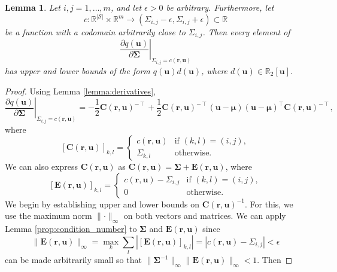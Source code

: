 \documentclass{article}
\newtheorem{lemma}[theorem]{Lemma}
\theoremstyle{definition}
\theoremstyle{remark}
\begin{document}
\begin{lemma} \label{lemma:bound3}
  Let $i, j = 1, \dots, m$, and let $\epsilon > 0$ be arbitrary. Furthermore,
  let
  \[
    c : \mathbb{R}^{|\mathcal{S}|} \times \mathbb{R}^m \to (\Sigma_{i,j} - \epsilon,
    \Sigma_{i,j} + \epsilon) \subset \mathbb{R}
  \]
  be a function with a codomain arbitrarily close to $\Sigma_{i,j}$. Then every
  element of
  \[
    \left. \frac{\partial q(\mathbf{u})}{\partial \bm\Sigma} \right|_{\Sigma_{i,j} =
    c(\mathbf{r}, \mathbf{u})}
  \]
  has upper and lower bounds of the form $q(\mathbf{u})d(\mathbf{u})$, where
  $d(\mathbf{u}) \in \mathbb{R}_2[\mathbf{u}]$.
\end{lemma}
\begin{proof}
  Using Lemma \ref{lemma:derivatives},
  \[
    \left. \frac{\partial q(\mathbf{u})}{\partial \bm\Sigma} \right|_{\Sigma_{i,j} =
    c(\mathbf{r}, \mathbf{u})} =
    -\frac{1}{2}\mathbf{C}(\mathbf{r}, \mathbf{u})^{-\intercal} +
    \frac{1}{2}\mathbf{C}(\mathbf{r}, \mathbf{u})^{-\intercal}(\mathbf{u} -
    \bm\mu)(\mathbf{u} -
    \bm\mu)^\intercal\mathbf{C}(\mathbf{r}, \mathbf{u})^{-\intercal},
  \]
  where
  \[
    [\mathbf{C}(\mathbf{r}, \mathbf{u})]_{k,l} =
    \begin{cases}
      c(\mathbf{r}, \mathbf{u}) & \text{if } (k, l) = (i, j), \\
      \Sigma_{k,l} & \text{otherwise.}
    \end{cases}
  \]
  We can also express $\mathbf{C}(\mathbf{r},\mathbf{u})$ as
  $\mathbf{C}(\mathbf{r}, \mathbf{u}) = \bm\Sigma + \mathbf{E}(\mathbf{r},
  \mathbf{u})$, where
  \[
    [\mathbf{E}(\mathbf{r}, \mathbf{u})]_{k,l} =
    \begin{cases}
      c(\mathbf{r}, \mathbf{u}) - \Sigma_{i,j} & \text{if } (k, l) = (i, j), \\
      0 & \text{otherwise.}
    \end{cases}
  \]
  We begin by establishing upper and lower bounds on $\mathbf{C}(\mathbf{r},
  \mathbf{u})^{-1}$. For this, we use the maximum norm $\lVert \cdot
  \rVert_\infty$ on both vectors and matrices. We can apply Lemma
  \ref{prop:condition_number} to $\bm\Sigma$ and $\mathbf{E}(\mathbf{r},
  \mathbf{u})$ since
  \[
    \lVert \mathbf{E}(\mathbf{r}, \mathbf{u}) \rVert_\infty = \max_k \sum_l
    |[\mathbf{E}(\mathbf{r}, \mathbf{u})]_{k,l}| = |c(\mathbf{r}, \mathbf{u}) -
    \Sigma_{i,j}| < \epsilon
  \]
  can be made arbitrarily small so that $\lVert \bm\Sigma^{-1} \rVert_\infty
  \lVert \mathbf{E}(\mathbf{r}, \mathbf{u}) \rVert_\infty < 1$. Then

\end{proof}
\end{document}
